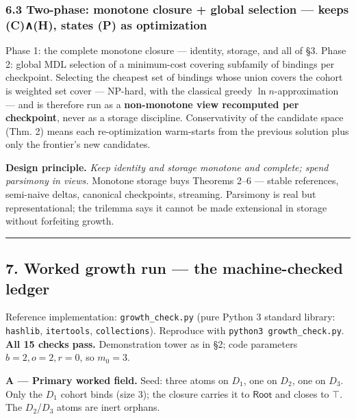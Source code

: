\documentclass[
  10pt,
]{article}
\begin{document}
\hypertarget{two-phase-monotone-closure-global-selection-keeps-ch-states-p-as-optimization}{%
\subsubsection{6.3 Two-phase: monotone closure + global selection ---
keeps (C)∧(H), states (P) as
optimization}\label{two-phase-monotone-closure-global-selection-keeps-ch-states-p-as-optimization}}

Phase 1: the complete monotone closure --- identity, storage, and all of
§3. Phase 2: global MDL selection of a minimum-cost covering subfamily
of bindings per checkpoint. Selecting the cheapest set of bindings whose
union covers the cohort is weighted set cover --- NP-hard, with the
classical greedy \(\ln n\)-approximation --- and is therefore run as a
\textbf{non-monotone view recomputed per checkpoint}, never as a storage
discipline. Conservativity of the candidate space (Thm. 2) means each
re-optimization warm-starts from the previous solution plus only the
frontier's new candidates.

\textbf{Design principle.} \emph{Keep identity and storage monotone and
complete; spend parsimony in views.} Monotone storage buys Theorems 2--6
--- stable references, semi-naive deltas, canonical checkpoints,
streaming. Parsimony is real but representational; the trilemma says it
cannot be made extensional in storage without forfeiting growth.

\begin{center}\rule{0.5\linewidth}{0.5pt}\end{center}

\hypertarget{worked-growth-run-the-machine-checked-ledger}{%
\subsection{7. Worked growth run --- the machine-checked
ledger}\label{worked-growth-run-the-machine-checked-ledger}}

Reference implementation: \texttt{growth\_check.py} (pure Python 3
standard library: \texttt{hashlib}, \texttt{itertools},
\texttt{collections}). Reproduce with
\texttt{python3\ growth\_check.py}. \textbf{All 15 checks pass.}
Demonstration tower as in §2; code parameters \(b = 2, o = 2, r = 0\),
so \(m_0 = 3\).

\textbf{A --- Primary worked field.} Seed: three atoms on \(D_1\), one
on \(D_2\), one on \(D_3\). Only the \(D_1\) cohort binds (size 3); the
closure carries it to \(\mathsf{Root}\) and closes to \(\top\). The
\(D_2\)/\(D_3\) atoms are inert orphans.
\end{document}
